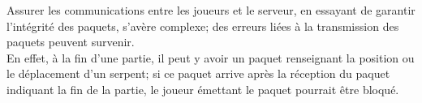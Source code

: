 \par
Assurer les communications entre les joueurs et le serveur, en essayant de garantir l'intégrité des paquets, s'avère complexe; des erreurs liées à la transmission des paquets peuvent survenir.\\
En effet, à la fin d'une partie, il peut y avoir un paquet renseignant la position ou le déplacement d'un serpent; si ce paquet arrive après la réception du paquet indiquant la fin de la partie, le joueur émettant le paquet pourrait être bloqué. \\